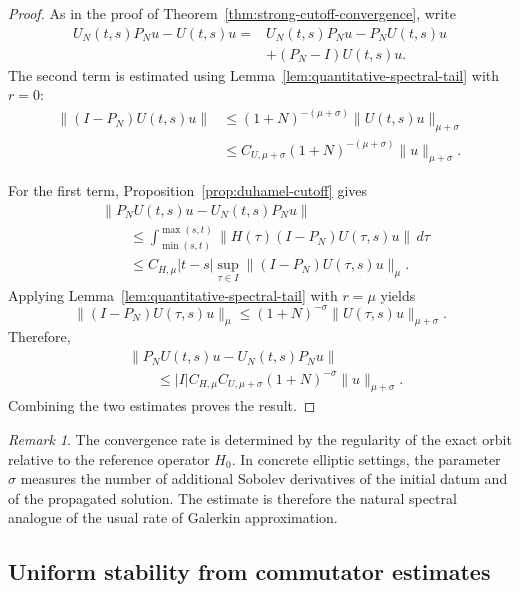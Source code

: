 \documentclass[11pt]{amsart}
\theoremstyle{plain}
\theoremstyle{definition}
\theoremstyle{remark}
\newtheorem{remark}[theorem]{Remark}
\begin{document}
\begin{proof}
As in the proof of Theorem~\ref{thm:strong-cutoff-convergence}, write
\[
\begin{split}
U_{N}(t,s)P_{N}u-U(t,s)u
={}&
U_{N}(t,s)P_{N}u-P_{N}U(t,s)u
\\
&+
(P_{N}-I)U(t,s)u.
\end{split}
\]
The second term is estimated using
Lemma~\ref{lem:quantitative-spectral-tail} with \(r=0\):
\[
\begin{split}
\|(I-P_{N})U(t,s)u\|
&\leq
(1+N)^{-(\mu+\sigma)}
\|U(t,s)u\|_{\mu+\sigma}
\\
&\leq
C_{U,\mu+\sigma}
(1+N)^{-(\mu+\sigma)}
\|u\|_{\mu+\sigma}.
\end{split}
\]

For the first term, Proposition~\ref{prop:duhamel-cutoff} gives
\[
\begin{split}
&\|P_{N}U(t,s)u-U_{N}(t,s)P_{N}u\|
\\
&\qquad\leq
\int_{\min(s,t)}^{\max(s,t)}
\|H(\tau)(I-P_{N})U(\tau,s)u\|\,d\tau
\\
&\qquad\leq
C_{H,\mu}|t-s|
\sup_{\tau\in I}
\|(I-P_{N})U(\tau,s)u\|_{\mu}.
\end{split}
\]
Applying Lemma~\ref{lem:quantitative-spectral-tail} with \(r=\mu\)
yields
\[
\|(I-P_{N})U(\tau,s)u\|_{\mu}
\leq
(1+N)^{-\sigma}
\|U(\tau,s)u\|_{\mu+\sigma}.
\]
Therefore,
\[
\begin{split}
&\|P_{N}U(t,s)u-U_{N}(t,s)P_{N}u\|
\\
&\qquad\leq
|I|C_{H,\mu}C_{U,\mu+\sigma}
(1+N)^{-\sigma}
\|u\|_{\mu+\sigma}.
\end{split}
\]
Combining the two estimates proves the result.
\end{proof}

\begin{remark}
\label{rem:spectral-rate-interpretation}
The convergence rate is determined by the regularity of the exact orbit
relative to the reference operator \(H_{0}\). In concrete elliptic settings,
the parameter \(\sigma\) measures the number of additional Sobolev derivatives
of the initial datum and of the propagated solution. The estimate is therefore
the natural spectral analogue of the usual rate of Galerkin approximation.
\end{remark}


\subsection{Uniform stability from commutator estimates}
\label{subsec:commutator-stability}
\end{document}
